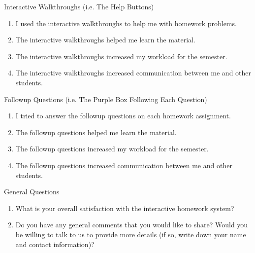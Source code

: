 Interactive Walkthroughs (i.e. The Help Buttons)

\begin{enumerate}
	\item I used the interactive walkthroughs to help me with homework problems.
	\item The interactive walkthroughs helped me learn the material.
	\item The interactive walkthroughs increased my workload for the semester.
	\item The interactive walkthroughs increased communication between me and other students.
\end{enumerate}

Followup Questions (i.e. The Purple Box Following Each Question)

\begin{enumerate}
	\item I tried to answer the followup questions on each homework assignment.
	\item The followup questions helped me learn the material.
	\item The followup questions increased my workload for the semester.
	\item The followup questions increased communication between me and other students.
\end{enumerate}

General Questions

\begin{enumerate}
	\item What is your overall satisfaction with the interactive homework system?
	\item Do you have any general comments that you would like to share? Would you be willing to talk to us to provide more details (if so, write down your name and contact information)?
\end{enumerate}
